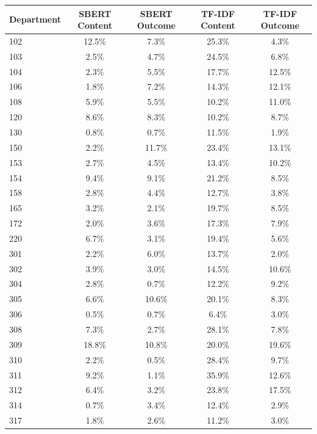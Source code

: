 \begin{table}[ht]
    \centering
    \small
    \begin{tabular}{lcccc}
        \hline
        Department & SBERT Content & SBERT Outcome & TF-IDF Content & TF-IDF Outcome \\
        \hline
        102 & 12.5\% & 7.3\% & 25.3\% & 4.3\% \\
        103 & 2.5\% & 4.7\% & 24.5\% & 6.8\% \\
        104 & 2.3\% & 5.5\% & 17.7\% & 12.5\% \\
        106 & 1.8\% & 7.2\% & 14.3\% & 12.1\% \\
        108 & 5.9\% & 5.5\% & 10.2\% & 11.0\% \\
        120 & 8.6\% & 8.3\% & 10.2\% & 8.7\% \\
        130 & 0.8\% & 0.7\% & 11.5\% & 1.9\% \\
        150 & 2.2\% & 11.7\% & 23.4\% & 13.1\% \\
        153 & 2.7\% & 4.5\% & 13.4\% & 10.2\% \\
        154 & 9.4\% & 9.1\% & 21.2\% & 8.5\% \\
        158 & 2.8\% & 4.4\% & 12.7\% & 3.8\% \\
        165 & 3.2\% & 2.1\% & 19.7\% & 8.5\% \\
        172 & 2.0\% & 3.6\% & 17.3\% & 7.9\% \\
        220 & 6.7\% & 3.1\% & 19.4\% & 5.6\% \\
        301 & 2.2\% & 6.0\% & 13.7\% & 2.0\% \\
        302 & 3.9\% & 3.0\% & 14.5\% & 10.6\% \\
        304 & 2.8\% & 0.7\% & 12.2\% & 9.2\% \\
        305 & 6.6\% & 10.6\% & 20.1\% & 8.3\% \\
        306 & 0.5\% & 0.7\% & 6.4\% & 3.0\% \\
        308 & 7.3\% & 2.7\% & 28.1\% & 7.8\% \\
        309 & 18.8\% & 10.8\% & 20.0\% & 19.6\% \\
        310 & 2.2\% & 0.5\% & 28.4\% & 9.7\% \\
        311 & 9.2\% & 1.1\% & 35.9\% & 12.6\% \\
        312 & 6.4\% & 3.2\% & 23.8\% & 17.5\% \\
        314 & 0.7\% & 3.4\% & 12.4\% & 2.9\% \\
        317 & 1.8\% & 2.6\% & 11.2\% & 3.0\% \\

\end{tabular}
\end{table}
